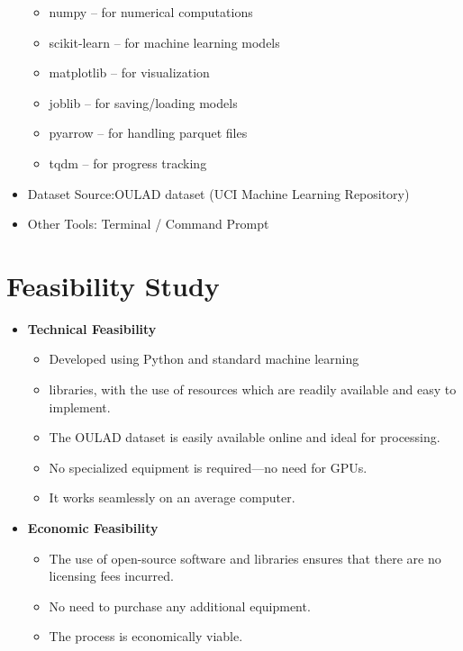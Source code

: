 \begin{spacing}{1.5}
\begin{itemize}
\begin{itemize}
\item numpy – for numerical computations

\item scikit-learn – for machine learning models

\item matplotlib – for visualization

\item joblib – for saving/loading models

\item pyarrow – for handling parquet files

\item tqdm – for progress tracking
\end{itemize}

\item Dataset Source:OULAD dataset (UCI Machine Learning Repository)
\item Other Tools: Terminal / Command Prompt


\end{itemize}






\section{Feasibility Study}
\begin{itemize}
\item \textbf{Technical Feasibility}

\begin{itemize}
    \item Developed using Python and standard machine learning 
    \item libraries, with the use of resources which are readily available and easy to implement. 
\item The OULAD dataset is easily available online and ideal for processing. 
\item No specialized equipment is required—no need for GPUs. 
\item It works seamlessly on an average computer.
\end{itemize}
\item \textbf{Economic Feasibility}
\begin{itemize}
    \item The use of open-source software and libraries ensures that there are no licensing fees incurred.
\item No need to purchase any additional equipment. 
\item The process is economically viable.



\end{itemize}
\end{itemize}
\end{spacing}
